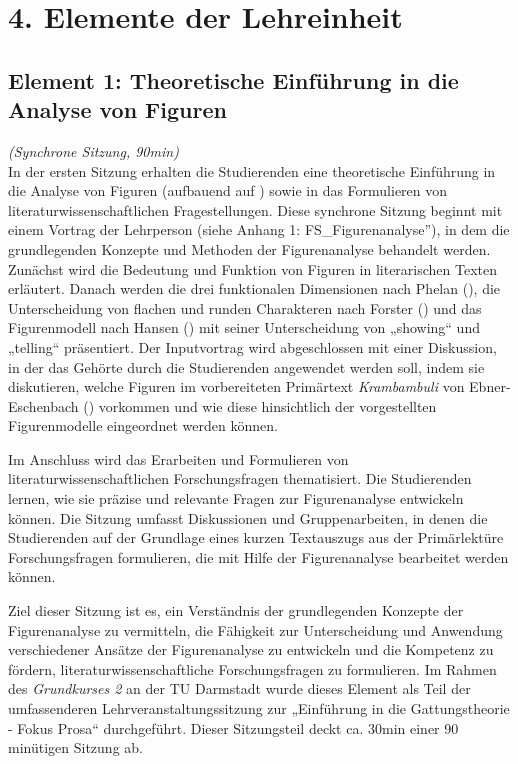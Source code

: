 \documentclass[
          a4paper,
        ]{article}
\begin{document}
\section{4. Elemente der Lehreinheit}\label{elemente-der-lehreinheit}

\subsection{Element 1: Theoretische Einführung in die Analyse von
Figuren}\label{element-1-theoretische-einfuxfchrung-in-die-analyse-von-figuren}

\emph{(Synchrone Sitzung, 90min)}\\
In der ersten Sitzung erhalten die Studierenden eine theoretische
Einführung in die Analyse von Figuren (aufbauend auf
) sowie in das
Formulieren von literaturwissenschaftlichen Fragestellungen. Diese
synchrone Sitzung beginnt mit einem Vortrag der Lehrperson (siehe Anhang
1: FS\_Figurenanalyse''), in dem die grundlegenden Konzepte und Methoden
der Figurenanalyse behandelt werden. Zunächst wird die Bedeutung und
Funktion von Figuren in literarischen Texten erläutert. Danach werden
die drei funktionalen Dimensionen nach Phelan
(), die Unterscheidung von flachen und
runden Charakteren nach Forster () und
das Figurenmodell nach Hansen () mit
seiner Unterscheidung von „showing`` und „telling`` präsentiert. Der
Inputvortrag wird abgeschlossen mit einer Diskussion, in der das Gehörte
durch die Studierenden angewendet werden soll, indem sie diskutieren,
welche Figuren im vorbereiteten Primärtext \emph{Krambambuli} von
Ebner-Eschenbach ()
vorkommen und wie diese hinsichtlich der vorgestellten Figurenmodelle
eingeordnet werden können.

Im Anschluss wird das Erarbeiten und Formulieren von
literaturwissenschaftlichen Forschungsfragen thematisiert. Die
Studierenden lernen, wie sie präzise und relevante Fragen zur
Figurenanalyse entwickeln können. Die Sitzung umfasst Diskussionen und
Gruppenarbeiten, in denen die Studierenden auf der Grundlage eines
kurzen Textauszugs aus der Primärlektüre Forschungsfragen formulieren,
die mit Hilfe der Figurenanalyse bearbeitet werden können.

Ziel dieser Sitzung ist es, ein Verständnis der grundlegenden Konzepte
der Figurenanalyse zu vermitteln, die Fähigkeit zur Unterscheidung und
Anwendung verschiedener Ansätze der Figurenanalyse zu entwickeln und die
Kompetenz zu fördern, literaturwissenschaftliche Forschungsfragen zu
formulieren. Im Rahmen des \emph{Grundkurses 2} an der TU Darmstadt
wurde dieses Element als Teil der umfassenderen
Lehrveranstaltungssitzung zur „Einführung in die Gattungstheorie - Fokus
Prosa`` durchgeführt. Dieser Sitzungsteil deckt ca. 30min einer 90
minütigen Sitzung ab.
\end{document}
